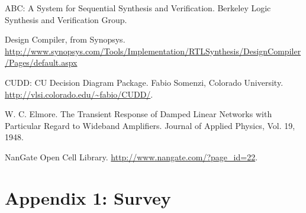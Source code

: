 \documentclass[12pt]{article}
\begin{document}
\newpage
\begin{thebibliography}{9}

ABC: A System for Sequential Synthesis and Verification. Berkeley Logic Synthesis and Verification Group.
 
Design Compiler, from Synopsys. \url{http://www.synopsys.com/Tools/Implementation/RTLSynthesis/DesignCompiler/Pages/default.aspx}

CUDD: CU Decision Diagram Package. Fabio Somenzi, Colorado University. \url{http://vlsi.colorado.edu/~fabio/CUDD/}.

W. C. Elmore. The Transient Response of Damped Linear Networks with Particular Regard to Wideband Amplifiers. Journal of Applied Physics, Vol. 19, 1948.

NanGate Open Cell Library. \url{http://www.nangate.com/?page_id=22}.
\end{thebibliography}

\newpage
\listoffigures

\newpage
\listoftables

\section{Appendix 1: Survey}


%
\end{document}
